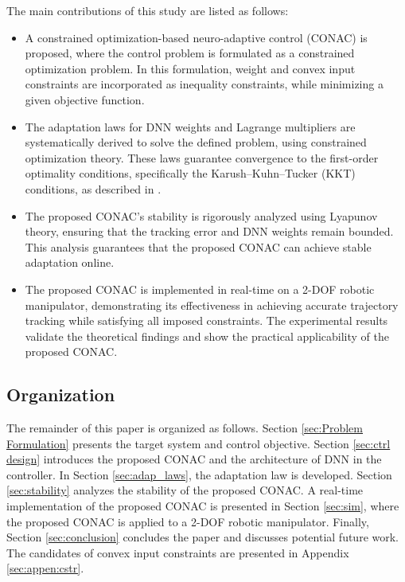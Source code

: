 \documentclass[journal]{IEEEtran}
\begin{document}
The main contributions of this study are listed as follows:
\begin{itemize}
    \item A constrained optimization-based neuro-adaptive control (CONAC) is proposed, where the control problem is formulated as a constrained optimization problem. In this formulation, weight and convex input constraints are incorporated as inequality constraints, while minimizing a given objective function.
    \item The adaptation laws for DNN weights and Lagrange multipliers are systematically derived to solve the defined problem, using constrained optimization theory. These laws guarantee convergence to the first-order optimality conditions, specifically the Karush–Kuhn–Tucker (KKT) conditions, as described in \cite[Chap. 12 Thm. 12.1]{Nocedal:2006aa}.
    \item The proposed CONAC's stability is rigorously analyzed using Lyapunov theory, ensuring that the tracking error and DNN weights remain bounded. This analysis guarantees that the proposed CONAC can achieve stable adaptation online.
    \item The proposed CONAC is implemented in real-time on a 2-DOF robotic manipulator, demonstrating its effectiveness in achieving accurate trajectory tracking while satisfying all imposed constraints. The experimental results validate the theoretical findings and show the practical applicability of the proposed CONAC.
\end{itemize}

\subsection{Organization}

The remainder of this paper is organized as follows. 
Section \ref{sec:Problem Formulation} presents the target system and control objective.
Section \ref{sec:ctrl design} introduces the proposed CONAC and the architecture of DNN in the controller. 
In Section \ref{sec:adap_laws}, the adaptation law is developed.
Section \ref{sec:stability} analyzes the stability of the proposed CONAC.
A real-time implementation of the proposed CONAC is presented in Section \ref{sec:sim}, where the proposed CONAC is applied to a 2-DOF robotic manipulator.
Finally, Section \ref{sec:conclusion} concludes the paper and discusses potential future work.
The candidates of convex input constraints are presented in Appendix \ref{sec:appen:cstr}. 
\end{document}
